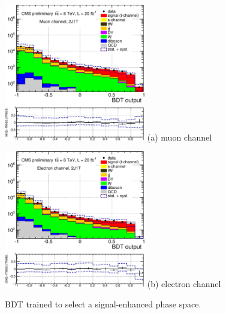 \documentclass[a4paper]{jpconf}
\begin{document}
\begin{figure}[h]
\begin{center}
\begin{minipage}{7cm}
\includegraphics[height=6.0cm]{mva_bdt_mu-crop}
\center (a) muon channel
\end{minipage}\hspace{1cm}%
\begin{minipage}{7cm}
\includegraphics[height=6.0cm]{mva_bdt_el-crop}
\center (b) electron channel
\end{minipage} 
\caption{\label{fig:bdt}BDT trained to select a signal-enhanced phase space.}
\end{center}
\end{figure}
\end{document}

